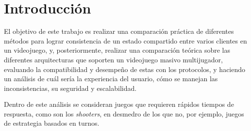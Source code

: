 \section{Introducción}

El objetivo de este trabajo es realizar una comparación práctica de diferentes métodos para lograr consistencia de un estado compartido entre varios clientes en un videojuego, y, posteriormente, realizar una comparación teórica sobre las diferentes arquitecturas que soporten un videojuego masivo multijugador, evaluando la compatibilidad y desempeño de estas con los protocolos, y haciendo un análisis de cuál sería la experiencia del usuario, cómo se manejan las inconsistencias, su seguridad y escalabilidad.

Dentro de este análisis se consideran juegos que requieren rápidos tiempos de respuesta, como son los \emph{shooters}, en desmedro de los que no, por ejemplo, juegos de estrategia basados en turnos.



